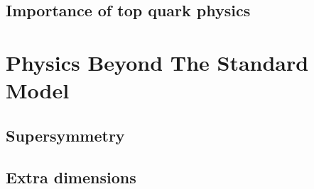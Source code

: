 \subsection{Importance of top quark physics}
\label{ss:importance}

\section{Physics Beyond The Standard Model}
\label{s:BSM}

\subsection{Supersymmetry}
\label{ss:SUSY}

\subsection{Extra dimensions}
\label{ss:extra_dimensions}



